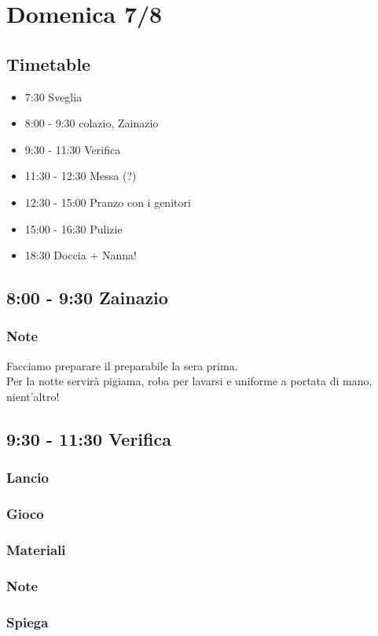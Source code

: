 \documentclass[../main.tex]{subfiles}
\begin{document}
   \section{Domenica 7/8}
   \subsection{Timetable}
   \begin{itemize}
        \item 7:30 Sveglia
        \item 8:00 - 9:30 colazio, Zainazio
        \item 9:30 - 11:30 Verifica
        \item 11:30 - 12:30 Messa (?)
        \item 12:30 - 15:00 Pranzo con i genitori
        \item 15:00 - 16:30 Pulizie
        \item 18:30 Doccia + Nanna!
    \end{itemize}

   \subsection{8:00 - 9:30 Zainazio}
        \subsubsection{Note}
        Facciamo preparare il preparabile la sera prima.\\
        Per la notte servirà pigiama, roba per lavarsi e uniforme a portata di mano, nient'altro!

    \subsection{9:30 - 11:30 Verifica}
        \subsubsection{Lancio}
        \subsubsection{Gioco}

        \subsubsection{Materiali}
        \subsubsection{Note}
        \subsubsection{Spiega}
\end{document}
